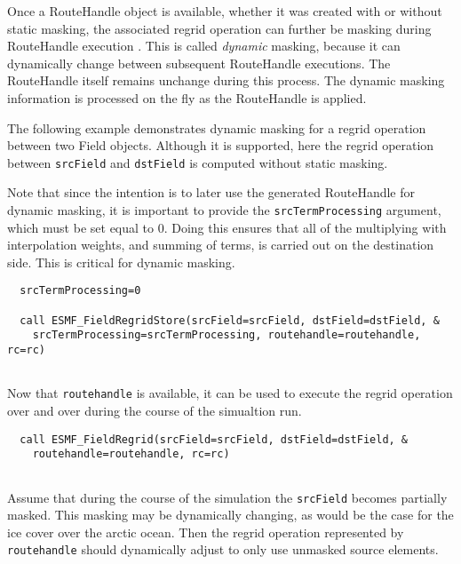    Once a RouteHandle object is available, whether it was created with or without 
   static masking, the associated regrid operation can further be masking 
   during RouteHandle execution . This is called {\em dynamic} masking, because
   it can dynamically change between subsequent RouteHandle executions. The 
   RouteHandle itself remains unchange during this process. The dynamic
   masking information is processed on the fly as the RouteHandle is applied.
  
   The following example demonstrates dynamic masking for a regrid operation
   between two Field objects. Although it is supported, here
   the regrid operation between {\tt srcField} and {\tt dstField} is computed
   without static masking. 

   Note that since the intention is to later use the generated RouteHandle for
   dynamic masking, it is important to provide the {\tt srcTermProcessing} 
   argument, which must be set equal to 0. Doing this ensures that all
   of the multiplying with interpolation weights, and summing of terms, is
   carried out on the destination side. This is critical for dynamic masking. 

 \begin{verbatim}
  srcTermProcessing=0

  call ESMF_FieldRegridStore(srcField=srcField, dstField=dstField, &
    srcTermProcessing=srcTermProcessing, routehandle=routehandle, rc=rc)
 
\end{verbatim}
 

   Now that {\tt routehandle} is available, it can be used to execute the 
   regrid operation over and over during the course of the simualtion run. 

 \begin{verbatim}
  call ESMF_FieldRegrid(srcField=srcField, dstField=dstField, &
    routehandle=routehandle, rc=rc)
 
\end{verbatim}
 

   Assume that during the course of the simulation the {\tt srcField} becomes
   partially masked. This masking may be dynamically changing, as would be the
   case for the ice cover over the arctic ocean. Then the regrid operation 
   represented by {\tt routehandle} should dynamically adjust to only use
   unmasked source elements.
  
